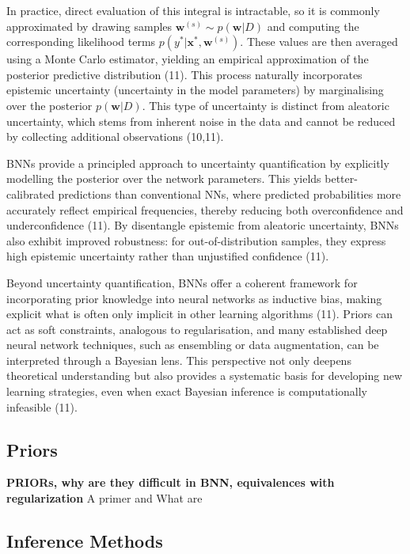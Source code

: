 \documentclass[
  a4paper,
]{scrreprt}
\begin{document}
In practice, direct evaluation of this integral is intractable, so it is
commonly approximated by drawing samples
\(\mathbf{w}^{(s)} \sim p(\mathbf{w} | D)\) and computing the
corresponding likelihood terms
\(p(y^{*} | \mathbf{x}^{*}, \mathbf{w}^{(s)})\). These values are then
averaged using a Monte Carlo estimator, yielding an empirical
approximation of the posterior predictive distribution (11). This
process naturally incorporates epistemic uncertainty (uncertainty in the
model parameters) by marginalising over the posterior
\(p(\mathbf{w} | D)\). This type of uncertainty is distinct from
aleatoric uncertainty, which stems from inherent noise in the data and
cannot be reduced by collecting additional observations (10,11).

BNNs provide a principled approach to uncertainty quantification by
explicitly modelling the posterior over the network parameters. This
yields better-calibrated predictions than conventional NNs, where
predicted probabilities more accurately reflect empirical frequencies,
thereby reducing both overconfidence and underconfidence (11). By
disentangle epistemic from aleatoric uncertainty, BNNs also exhibit
improved robustness: for out-of-distribution samples, they express high
epistemic uncertainty rather than unjustified confidence (11).

Beyond uncertainty quantification, BNNs offer a coherent framework for
incorporating prior knowledge into neural networks as inductive bias,
making explicit what is often only implicit in other learning algorithms
(11). Priors can act as soft constraints, analogous to regularisation,
and many established deep neural network techniques, such as ensembling
or data augmentation, can be interpreted through a Bayesian lens. This
perspective not only deepens theoretical understanding but also provides
a systematic basis for developing new learning strategies, even when
exact Bayesian inference is computationally infeasible (11).

\subsection{Priors}\label{priors}

\textbf{PRIORs, why are they difficult in BNN, equivalences with
regularization} A primer and What are

\subsection{Inference Methods}\label{inference-methods}
\end{document}
